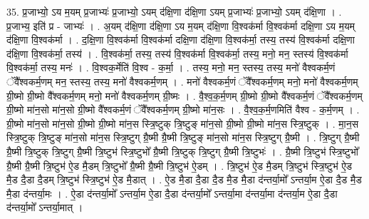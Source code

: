 \documentclass[17pt]{extarticle}
\begin{document}
35. प्र॒जाभ्यो॒ ऽय म॒यम् प्र॒जाभ्यः॑ प्र॒जाभ्यो॒ ऽयम् द॑क्षि॒णा द॑क्षि॒णा ऽयम् प्र॒जाभ्यः॑ प्र॒जाभ्यो॒ ऽयम् द॑क्षि॒णा । . प्र॒जाभ्य॒ इति॑ प्र - जाभ्यः॑ । . अ॒यम् द॑क्षि॒णा द॑क्षि॒णा ऽय म॒यम् द॑क्षि॒णा वि॒श्वक॑र्मा वि॒श्वक॑र्मा दक्षि॒णा ऽय म॒यम् द॑क्षि॒णा वि॒श्वक॑र्मा । . द॒क्षि॒णा वि॒श्वक॑र्मा वि॒श्वक॑र्मा दक्षि॒णा द॑क्षि॒णा वि॒श्वक॑र्मा॒ तस्य॒ तस्य॑ वि॒श्वक॑र्मा दक्षि॒णा द॑क्षि॒णा वि॒श्वक॑र्मा॒ तस्य॑ । . वि॒श्वक॑र्मा॒ तस्य॒ तस्य॑ वि॒श्वक॑र्मा वि॒श्वक॑र्मा॒ तस्य॒ मनो॒ मन॒ स्तस्य॑ वि॒श्वक॑र्मा वि॒श्वक॑र्मा॒ तस्य॒ मनः॑ । . वि॒श्वक॒र्मेति॑ वि॒श्व - क॒र्मा॒ । . तस्य॒ मनो॒ मन॒ स्तस्य॒ तस्य॒ मनो॑ वैश्वकर्म॒णं ॅवै᳚श्वकर्म॒णम् मन॒ स्तस्य॒ तस्य॒ मनो॑ वैश्वकर्म॒णम् । . मनो॑ वैश्वकर्म॒णं ॅवै᳚श्वकर्म॒णम् मनो॒ मनो॑ वैश्वकर्म॒णम् ग्री॒ष्मो ग्री॒ष्मो वै᳚श्वकर्म॒णम् मनो॒ मनो॑ वैश्वकर्म॒णम् ग्री॒ष्मः । . वै॒श्व॒क॒र्म॒णम् ग्री॒ष्मो ग्री॒ष्मो वै᳚श्वकर्म॒णं ॅवै᳚श्वकर्म॒णम् ग्री॒ष्मो मा॑न॒सो मा॑न॒सो ग्री॒ष्मो वै᳚श्वकर्म॒णं ॅवै᳚श्वकर्म॒णम् ग्री॒ष्मो मा॑न॒सः । . वै॒श्व॒क॒र्म॒णमिति॑ वैश्व - क॒र्म॒णम् । . ग्री॒ष्मो मा॑न॒सो मा॑न॒सो ग्री॒ष्मो ग्री॒ष्मो मा॑न॒स स्त्रि॒ष्टुक् त्रि॒ष्टुङ् मा॑न॒सो ग्री॒ष्मो ग्री॒ष्मो मा॑न॒स स्त्रि॒ष्टुक् । . मा॒न॒स स्त्रि॒ष्टुक् त्रि॒ष्टुङ् मा॑न॒सो मा॑न॒स स्त्रि॒ष्टुग् ग्रै॒ष्मी ग्रै॒ष्मी त्रि॒ष्टुङ् मा॑न॒सो मा॑न॒स स्त्रि॒ष्टुग् ग्रै॒ष्मी । . त्रि॒ष्टुग् ग्रै॒ष्मी ग्रै॒ष्मी त्रि॒ष्टुक् त्रि॒ष्टुग् ग्रै॒ष्मी त्रि॒ष्टुभ॑ स्त्रि॒ष्टुभो᳚ ग्रै॒ष्मी त्रि॒ष्टुक् त्रि॒ष्टुग् ग्रै॒ष्मी त्रि॒ष्टुभः॑ । . ग्रै॒ष्मी त्रि॒ष्टुभ॑ स्त्रि॒ष्टुभो᳚ ग्रै॒ष्मी ग्रै॒ष्मी त्रि॒ष्टुभ॑ ऐ॒ड मै॒डम् त्रि॒ष्टुभो᳚ ग्रै॒ष्मी ग्रै॒ष्मी त्रि॒ष्टुभ॑ ऐ॒डम् । . त्रि॒ष्टुभ॑ ऐ॒ड मै॒डम् त्रि॒ष्टुभ॑ स्त्रि॒ष्टुभ॑ ऐ॒ड मै॒ड दै॒डा दै॒डम् त्रि॒ष्टुभ॑ स्त्रि॒ष्टुभ॑ ऐ॒ड मै॒डात् । . ऐ॒ड मै॒डा दै॒डा दै॒ड मै॒ड मै॒डा द॑न्तर्या॒मो᳚ ऽन्तर्या॒म ऐ॒डा दै॒ड मै॒ड मै॒डा द॑न्तर्या॒मः । . ऐ॒डा द॑न्तर्या॒मो᳚ ऽन्तर्या॒म ऐ॒डा दै॒डा द॑न्तर्या॒मो᳚ ऽन्तर्या॒मा द॑न्तर्या॒मा द॑न्तर्या॒म ऐ॒डा दै॒डा द॑न्तर्या॒मो᳚ ऽन्तर्या॒मात् । \newline
\end{document}
